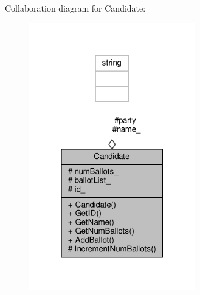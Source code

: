 Collaboration diagram for Candidate\+:\nopagebreak
\begin{figure}[H]
\begin{center}
\leavevmode
\includegraphics[width=205pt]{classCandidate__coll__graph}
\end{center}
\end{figure}

